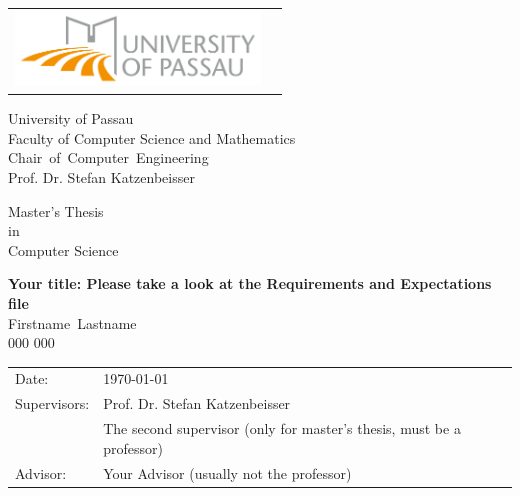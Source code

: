 \documentclass[fontsize=10pt,openright,oneside,paper=a4,BCOR=1cm,numbers=noenddot,english]{scrbook}
\newcommand{\authornamefirst}{Firstname}
\newcommand{\authornamelast}{Lastname}
\newcommand{\matrikelnummer}{000 000}
\newcommand{\worktitle}{Your title: Please take a look at the Requirements and Expectations file}
\newcommand{\thesistype}{Master's Thesis}
\newcommand{\courseofstudies}{Computer Science}
\newcommand{\thesisdate}{\today}   %
\newcommand{\thesisprof}{Prof. Dr. Stefan Katzenbeisser}
\newcommand{\thesisproftwo}{The second supervisor (only for master's thesis, must be a professor)}
\newcommand{\chair}{\mbox{Chair of Computer Engineering}}
\newcommand{\advisor}{Your Advisor (usually not the professor)}
\let\epsilon\varepsilon
\begin{document}
\frontmatter
\thispagestyle{empty}
\newpage

\vspace{1cm}

\begin{center}
\begin{tabular}{lr}
\includegraphics[width=6.5cm]{img/logouni_en.png}
\end{tabular}

\vspace{3cm}
\Large University of Passau
\\
\Large Faculty of Computer Science and Mathematics
\\
\vspace{0.3cm}
\Large {\chair }
\\
\Large \thesisprof

\end{center}


\vspace{2.5cm}

\begin{center}
        {\Large \thesistype\\ in\\ \courseofstudies\\} 
\end{center}

\begin{center}
        \settowidth{\baselineskip}{0.4cm}
        {\LARGE \textbf{\worktitle}}
        \\
        {\Large
        \vspace{1cm}
        \authornamefirst~\authornamelast \\ \matrikelnummer \\
        }
\end{center}

\vfill {%

\vfill


{\large
\begin{tabular}[l]{llll}

Date:       & \thesisdate %
\smallskip \\
Supervisors:   & \thesisprof \\
	& \thesisproftwo \\
Advisor: & \advisor \\
\end{tabular}}
} \cleardoublepage
\end{document}
